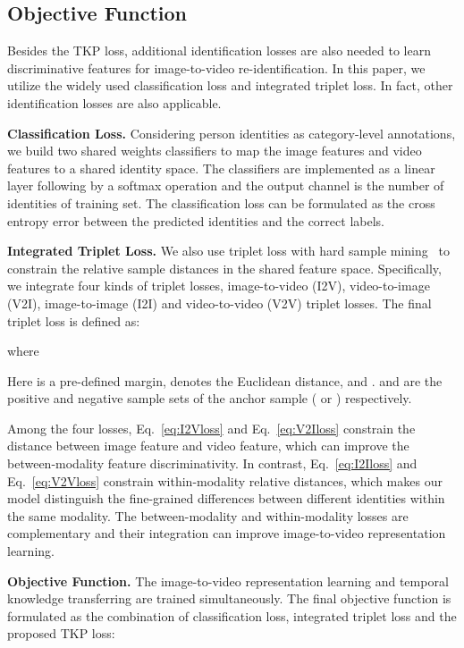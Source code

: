 \documentclass[10pt,twocolumn,letterpaper]{article}
\begin{document}
\subsection{Objective Function}
\label{sec:loss}
Besides the TKP loss, additional identification losses are also needed to learn discriminative features for image-to-video re-identification.
In this paper, we utilize the widely used classification loss and integrated triplet loss.
In fact, other identification losses are also applicable.

\vspace{3pt}
\noindent
{\bf Classification Loss.} Considering person identities as category-level annotations, we build two shared weights classifiers to map the image features and video features to a shared identity space.
The classifiers are implemented as a linear layer following by a softmax operation and the output channel is the number of identities of training set.
The classification loss  can be formulated as the cross entropy error between the predicted identities and the correct labels.

\vspace{3pt}
\noindent
{\bf Integrated Triplet Loss.} We also use triplet loss with hard sample mining~\cite{Hermans2017In} to constrain the relative sample distances in the shared feature space.
Specifically, we integrate four kinds of triplet losses, image-to-video (I2V), video-to-image (V2I), image-to-image (I2I) and video-to-video (V2V) triplet losses.
The final triplet loss  is defined as:

where




Here  is a pre-defined margin,  denotes the Euclidean distance, and .
 and  are the positive and negative sample sets of the anchor sample ( or ) respectively.

Among the four losses, Eq.~\eqref{eq:I2Vloss} and Eq.~\eqref{eq:V2Iloss} constrain the distance between image feature and video feature, which can improve the between-modality feature discriminativity.
In contrast, Eq.~\eqref{eq:I2Iloss} and Eq.~\eqref{eq:V2Vloss} constrain within-modality relative distances, which makes our model distinguish the fine-grained differences between different identities within the same modality.
The between-modality and within-modality losses are complementary and their integration can improve image-to-video representation learning.

\vspace{5pt}
\noindent
{\bf Objective Function.}
The image-to-video representation learning and temporal knowledge transferring are trained simultaneously.
The final objective function is formulated as the combination of classification loss, integrated triplet loss and the proposed TKP loss:
\end{document}
